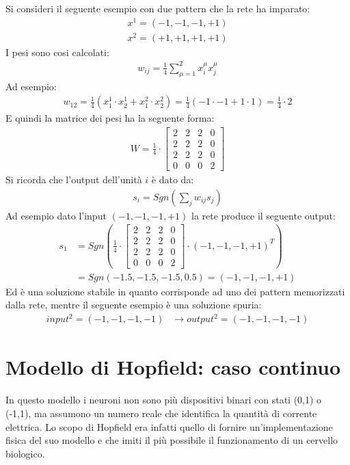 Si consideri il seguente esempio con due pattern che la rete ha imparato:
\begin{align*}
	x^1 = (-1,-1,-1,+1) \\
	x^2 = (+1,+1,+1,+1)
\end{align*}
I pesi sono cosi calcolati:
\begin{align*}
	w_{ij} = \frac{1}{4} \sum_{\mu=1}^2 x_i^\mu x_j^\mu
	\end{align*} 
	Ad esempio:
	\begin{align*}
		w_{12} = \frac{1}{4}(x^1_1 \cdot x^1_2 + x^2_1 \cdot x^2_2) = 
		\frac{1}{4}(-1 \cdot -1 + 1 \cdot 1) = \frac{1}{4} \cdot 2
	\end{align*}
	E quindi la matrice dei pesi ha la seguente forma:
	\begin{align*}
		W = \frac{1}{4} \cdot
		\begin{bmatrix}
			2 & 2 & 2 & 0 \\
			2 & 2 & 2 & 0 \\
			2 & 2 & 2 & 0 \\
			0 & 0 & 0 & 2
		\end{bmatrix}
	\end{align*}
	Si ricorda che l'output dell'unità $i$ è dato da:
	\begin{align*}
		s_i = Sgn \left(\sum_j w_{ij} s_j \right)
	\end{align*}
	Ad esempio dato l'input $(-1,-1,-1,+1)$ la rete produce il seguente output:
	\begin{align*}
		s_1 &= Sgn \left( \frac{1}{4} \cdot
		\begin{bmatrix}
			2 & 2 & 2 & 0 \\
			2 & 2 & 2 & 0 \\
			2 & 2 & 2 & 0 \\
			0 & 0 & 0 & 2
			\end{bmatrix} \cdot (-1, -1, -1, +1)^T \right) \\ 
			&= Sgn(-1.5, -1.5, -1.5, 0.5) = (-1,-1,-1,+1)
		\end{align*}
		Ed è una soluzione stabile in quanto corrisponde ad uno dei pattern memorizzati dalla rete, mentre il seguente esempio è una soluzione spuria:
		\begin{align*}
			input^2 = (-1,-1,-1,-1)&\longrightarrow output^2 = (-1,-1,-1,-1) \tag{spuria}
		\end{align*}


		\newpage


		\section{Modello di Hopfield: caso continuo} %
		\label{sec:modello_di_hopfield_caso_continuo}
		In questo modello i neuroni non sono più dispositivi binari con stati (0,1) o (-1,1), ma assumono un numero reale che identifica la quantità di corrente elettrica. Lo scopo di Hopfield era infatti quello di fornire un'implementazione fisica del suo modello e che imiti il più possibile il funzionamento di un cervello biologico.\\


